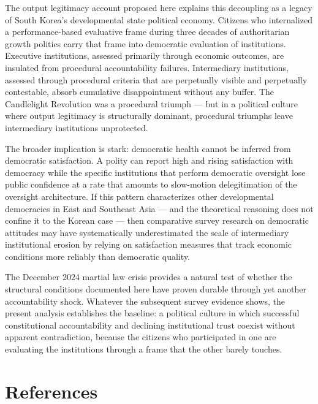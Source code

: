 \documentclass[
  12pt,
  letterpaper]{article}
\begin{document}
The output legitimacy account proposed here explains this decoupling as
a legacy of South Korea's developmental state political economy.
Citizens who internalized a performance-based evaluative frame during
three decades of authoritarian growth politics carry that frame into
democratic evaluation of institutions. Executive institutions, assessed
primarily through economic outcomes, are insulated from procedural
accountability failures. Intermediary institutions, assessed through
procedural criteria that are perpetually visible and perpetually
contestable, absorb cumulative disappointment without any buffer. The
Candlelight Revolution was a procedural triumph --- but in a political
culture where output legitimacy is structurally dominant, procedural
triumphs leave intermediary institutions unprotected.

The broader implication is stark: democratic health cannot be inferred
from democratic satisfaction. A polity can report high and rising
satisfaction with democracy while the specific institutions that perform
democratic oversight lose public confidence at a rate that amounts to
slow-motion delegitimation of the oversight architecture. If this
pattern characterizes other developmental democracies in East and
Southeast Asia --- and the theoretical reasoning does not confine it to
the Korean case --- then comparative survey research on democratic
attitudes may have systematically underestimated the scale of
intermediary institutional erosion by relying on satisfaction measures
that track economic conditions more reliably than democratic quality.

The December 2024 martial law crisis provides a natural test of whether
the structural conditions documented here have proven durable through
yet another accountability shock. Whatever the subsequent survey
evidence shows, the present analysis establishes the baseline: a
political culture in which successful constitutional accountability and
declining institutional trust coexist without apparent contradiction,
because the citizens who participated in one are evaluating the
institutions through a frame that the other barely touches.

\section*{References}\label{references}
\end{document}
